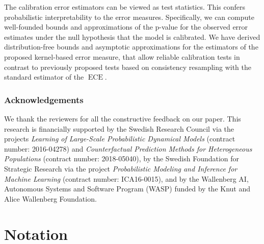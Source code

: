 \documentclass{article}
\DeclareMathOperator{\ECE}{ECE}
\begin{document}
The calibration error estimators can be viewed as test statistics. This confers
probabilistic interpretability to the error measures. Specifically, we can
compute well-founded bounds and approximations of the p-value for the observed
error estimates under the null hypothesis that the model is calibrated. We
have derived distribution-free bounds and asymptotic approximations for the
estimators of the proposed kernel-based error measure, that allow reliable
calibration tests in contrast to previously proposed tests based on consistency
resampling with the standard estimator of the $\ECE$.

\subsubsection*{Acknowledgements}

We thank the reviewers for all the constructive feedback on our paper.
This research is financially supported by the Swedish Research Council via the
projects \emph{Learning of Large-Scale Probabilistic Dynamical Models} (contract
number: 2016-04278) and \emph{Counterfactual Prediction Methods for Heterogeneous
  Populations} (contract number: 2018-05040), by the Swedish Foundation for
Strategic Research via the project \emph{Probabilistic Modeling and Inference
  for Machine Learning} (contract number: ICA16-0015), and by the Wallenberg AI,
Autonomous Systems and Software Program (WASP) funded by the Knut and Alice
Wallenberg Foundation.




\clearpage

\appendix
{}
\renewcommand*{\thetheorem}{\thesection.\arabic{theorem}}
\renewcommand*{\thelemma}{\thesection.\arabic{lemma}}
\renewcommand*{\theproposition}{\thesection.\arabic{proposition}}
\renewcommand*{\thecorollary}{\thesection.\arabic{corollary}}
\renewcommand*{\thedefinition}{\thesection.\arabic{definition}}
\renewcommand*{\theexample}{\thesection.\arabic{example}}
\renewcommand*{\theremark}{\thesection.\arabic{remark}}
\makeatletter
{}
\makeatother

\section{Notation}
\end{document}

